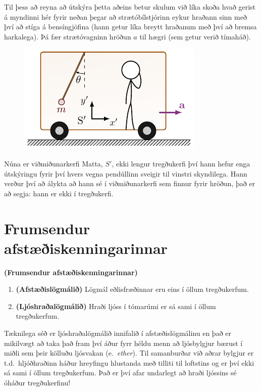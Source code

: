 \ifdefined \wholebook \else\documentclass[oneside]{book}\usepackage{EdlBook}\graphicspath{{figures/}}
\begin{document}
Til þess að reyna að útskýra þetta aðeins betur skulum við líka skoða hvað gerist á myndinni hér fyrir neðan þegar að strætóbílstjórinn eykur hraðann sinn með því að stíga á bensíngjöfina (hann getur líka breytt hraðanum með því að bremsa harkalega). Þá fær strætóvagninn hröðun $a$ til hægri (sem getur verið tímaháð).

\begin{figure}[H]
    \centering
    \includegraphics[width=.45\textwidth]{figures/ekkitregdukerfi.pdf}
\end{figure}

Núna er viðmiðunarkerfi Matta, $S'$, ekki lengur tregðukerfi því hann hefur enga útskýringu fyrir því hvers vegna pendúllinn sveigir til vinstri skyndilega. Hann verður því að álykta að hann sé í viðmiðunarkerfi sem finnur fyrir hröðun, það er að segja: hann er ekki í tregðukerfi. \\


\section{Frumsendur afstæðiskenningarinnar}

\begin{tcolorbox}
\begin{theorem}
\textbf{(Frumsendur afstæðiskenningarinnar)}
\begin{enumerate}[label = \textbf{(\arabic*)}]
    \item \textbf{(Afstæðislögmálið)} Lögmál eðlisfræðinnar eru eins í öllum tregðukerfum.
    \item \textbf{(Ljóshraðalögmálið)} Hraði ljóss í tómarúmi er sá sami í öllum tregðukerfum.
\end{enumerate}
\end{theorem}
\end{tcolorbox}

Tæknilega séð er ljóshraðalögmálið innifalið í afstæðislögmálinu en það er mikilvægt að taka það fram því áður fyrr héldu menn að ljósbylgjur bærust í miðli sem þeir kölluðu ljósvakan (e.~\emph{ether}). Til samanburðar við aðrar bylgjur er t.d.~hljóðhraðinn háður hreyfingu hlustanda með tilliti til loftstins og er því ekki sá sami í öllum tregðukerfum. Það er því afar undarlegt að hraði ljóssins sé óháður tregðukerfinu!
\end{document}
